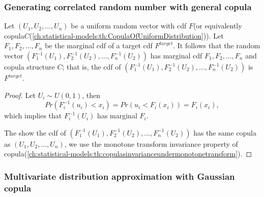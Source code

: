 \begin{refsection}
\subsubsection{Generating correlated random number with general copula}

\begin{lemma}\label{ch:statistical-models:th:transformCorrelatedUniformToArbitraryDistributionWithSameCopula}
Let  $(U_1,U_2,...,U_n)$ be a uniform random vector with cdf $F$(or equivalently copula$C$(\autoref{ch:statistical-models:th:CopulaOfUniformDistribution})). Let $F_1,F_2,...,F_n$ be the marginal cdf of a target cdf $F^{target}$.  It follows that
the random vector $(F^{-1}_1(U_1),F^{-1}_2(U_2),...,F^{-1}_n(U_2))$ has marginal cdf $F_1,F_2,...,F_n$ and copula structure $C$; that is, the cdf of $(F^{-1}_1(U_1),F^{-1}_2(U_2),...,F^{-1}_n(U_2))$ is $F^{target}$.
\end{lemma}
\begin{proof}
Let $U_i\sim U(0,1)$, then
$$Pr(F^{-1}_i(u_i) < x_i) = Pr(u_i < F_i(x_i)) = F_i(x_i) ,$$
which implies that $F^{-1}_i(U_i)$ has marginal $F_i$.

The show the cdf of $(F^{-1}_1(U_1),F^{-1}_2(U_2),...,F^{-1}_n(U_2))$ has the same copula as $(U_1,U_2,...,U_n)$, we use the monotone transform invariance property of copula(\autoref{ch:statistical-models:th:copulasinvarianceundermonotonetransform}).
\end{proof}









\subsubsection{Multivariate distribution approximation with Gaussian copula}


\end{refsection}
